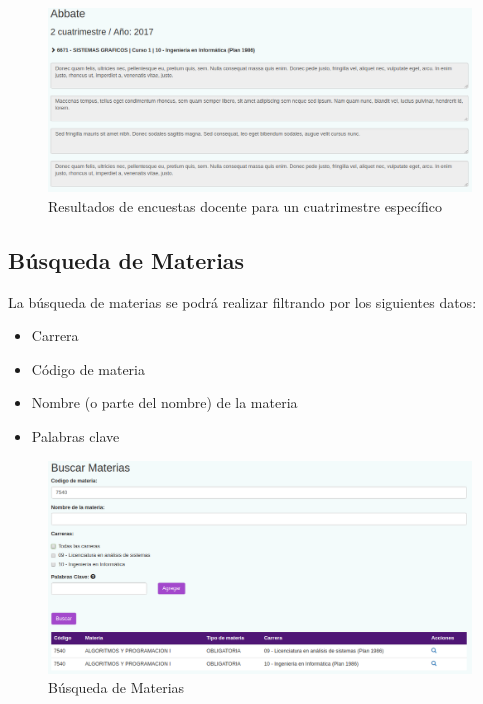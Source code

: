 \documentclass[a4paper]{article}
\begin{document}
\begin{figure}[H]
\centering
\includegraphics[scale=0.35]{Imagenes/resultados_encuesta_cuatrimestre_docente.png}\par
\caption{Resultados de encuestas docente para un cuatrimestre específico}
\end{figure}

\subsection{Búsqueda de Materias}

La búsqueda de materias se podrá realizar filtrando por los siguientes datos:

\begin{itemize}
	\item Carrera
	\item Código de materia
	\item Nombre (o parte del nombre) de la materia
	\item Palabras clave
\end{itemize}

\begin{figure}[H]
\centering
\includegraphics[scale=0.35]{Imagenes/buscar_materias.png}\par
\caption{Búsqueda de Materias}
\end{figure}
\end{document}
